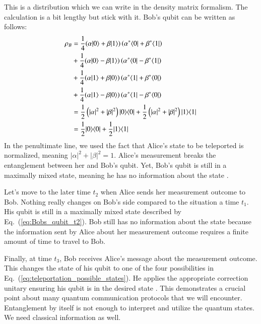 This is a distribution which we can write in the density matrix formalism.
The calculation is a bit lengthy but stick with it.
Bob's qubit can be written as follows:
\begin{equation}
\begin{aligned}
    \rho_B &=\frac{1}{4}(\alpha|0\rangle+\beta|1\rangle)\left(\alpha^*\langle 0|+\beta^*\langle 1|\right) \\
    &+\frac{1}{4}(\alpha|0\rangle-\beta|1\rangle)\left(\alpha^*\langle 0|-\beta^*\langle 1|\right) \\
    &+\frac{1}{4}(\alpha|1\rangle+\beta|0\rangle)\left(\alpha^*\langle 1|+\beta^*\langle 0|\right) \\
    &+\frac{1}{4}(\alpha|1\rangle-\beta|0\rangle)\left(\alpha^*\langle 1|-\beta^*\langle 0|\right) \\
    &=\frac{1}{2}\left(|\alpha|^2+|\beta|^2\right)\ketbra{0}{0} + \frac{1}{2}\left(|\alpha|^2+|\beta|^2\right)\ketbra{1}{1} \\
    &=\frac{1}{2}\ketbra{0}{0}+\frac{1}{2}\ketbra{1}{1}\\
    \label{eq:Bobs_qubit_t2}
\end{aligned}
\end{equation}
In the penultimate line, we used the fact that Alice's state to be teleported is normalized, meaning $|\alpha|^2+|\beta|^2=1$.
Alice's measurement breaks the entanglement between her and Bob's qubit.
Yet, Bob's qubit is still in a maximally mixed state, meaning he has no information about the state \ket{\psi}.

Let's move to the later time $t_2$ when Alice sends her measurement outcome to Bob.
Nothing really changes on Bob's side compared to the situation a time $t_1$.
His qubit is still in a maximally mixed state described by Eq.~(\ref{eq:Bobs_qubit_t2}).
Bob still has no information about the state \ket{\psi} because the information sent by Alice about her measurement outcome requires a finite amount of time to travel to Bob.

Finally, at time $t_3$, Bob receives Alice's message about the measurement outcome.
This changes the state of his qubit to one of the four possibilities in Eq.~(\ref{eq:teleportation_possible_states}).
He applies the appropriate correction unitary ensuring his qubit is in the desired state \ket{\psi}.
This demonstrates a crucial point about many quantum communication protocols that we will encounter.
Entanglement by itself is not enough to interpret and utilize the quantum states.
We need classical information as well.






